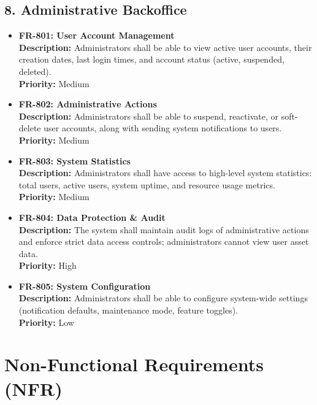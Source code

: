 \documentclass[11pt, a4paper]{article}
\newcommand{\reqid}[1]{\textbf{\color{PrimaryColor}#1}}
\begin{document}
	\subsection{8. Administrative Backoffice}
	\begin{itemize}
		\item \reqid{FR-801: User Account Management} \\
		\textbf{Description:} Administrators shall be able to view active user accounts, their creation dates, last login times, and account status (active, suspended, deleted). \\
		\textbf{Priority:} Medium
		
		\item \reqid{FR-802: Administrative Actions} \\
		\textbf{Description:} Administrators shall be able to suspend, reactivate, or soft-delete user accounts, along with sending system notifications to users. \\
		\textbf{Priority:} Medium
		
		\item \reqid{FR-803: System Statistics} \\
		\textbf{Description:} Administrators shall have access to high-level system statistics: total users, active users, system uptime, and resource usage metrics. \\
		\textbf{Priority:} Medium
		
		\item \reqid{FR-804: Data Protection \& Audit} \\
		\textbf{Description:} The system shall maintain audit logs of administrative actions and enforce strict data access controls; administrators cannot view user asset data. \\
		\textbf{Priority:} High
		
		\item \reqid{FR-805: System Configuration} \\
		\textbf{Description:} Administrators shall be able to configure system-wide settings (notification defaults, maintenance mode, feature toggles). \\
		\textbf{Priority:} Low
	\end{itemize}
	
	
	\section{Non-Functional Requirements (NFR)}
	
\end{document}
